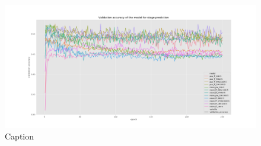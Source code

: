 \begin{figure}
    \centering
    \includegraphics[width=\linewidth]{images/val_acc_st.png}
    \caption{Caption}
    \label{fig:val_acc_st}
\end{figure}

